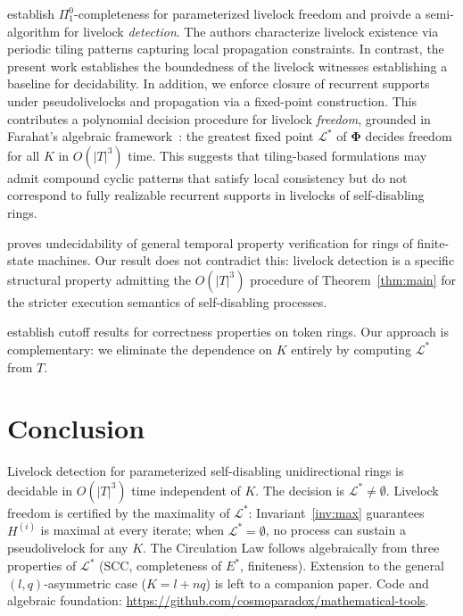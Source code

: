 \documentclass{article}
\newcommand{\Ls}{\mathcal{L}^{*}}
\newcommand{\Hi}[1]{H^{(#1)}}             %
\newcommand{\bPhi}{\boldsymbol{\Phi}}
\newcommand{\Estar}{E^{*}}
\begin{document}
\citet{klinkhamer2013,klinkhamer2019} establish $\Pi^0_1$-completeness
for parameterized livelock freedom and proivde a semi-algorithm for
livelock \emph{detection}. The authors characterize livelock existence via periodic tiling patterns capturing local propagation constraints. In contrast, the present work establishes the boundedness of the livelock witnesses establishing a baseline for decidability. In addition, we enforce closure of recurrent supports under pseudolivelocks and propagation via a fixed-point construction. This contributes a polynomial decision procedure for livelock \emph{freedom}, grounded in Farahat's
algebraic framework~\citep{farahat2012}: the greatest fixed point $\Ls$
of $\bPhi$ decides freedom for all $K$ in $O(|T|^3)$ time. This suggests that tiling-based formulations may admit compound cyclic patterns that satisfy local consistency but do not correspond to fully realizable recurrent supports in livelocks of self-disabling rings.

\citet{suzuki1988} proves undecidability of general temporal property
verification for rings of finite-state machines. Our result does not
contradict this: livelock detection is a specific structural property
admitting the $O(|T|^3)$ procedure of Theorem~\ref{thm:main} for the stricter execution semantics of self-disabling processes.

\citet{emerson1995} establish cutoff results for correctness properties
on token rings. Our approach is complementary: we eliminate the
dependence on $K$ entirely by computing $\Ls$ from $T$.

\section{Conclusion}

Livelock detection for parameterized self-disabling unidirectional rings
is decidable in $O(|T|^3)$ time independent of $K$. The decision is
$\Ls\neq\emptyset$. Livelock freedom is certified by the maximality of
$\Ls$: Invariant~\ref{inv:max} guarantees $\Hi{i}$ is maximal at every
iterate; when $\Ls=\emptyset$, no process can sustain a pseudolivelock
for any $K$. The Circulation Law follows algebraically from three
properties of $\Ls$ (SCC, completeness of $\Estar$, finiteness).
Extension to the general $(l,q)$-asymmetric case ($K=l+nq$) is left to
a companion paper. Code and algebraic foundation:
\url{https://github.com/cosmoparadox/mathematical-tools}.
\end{document}
